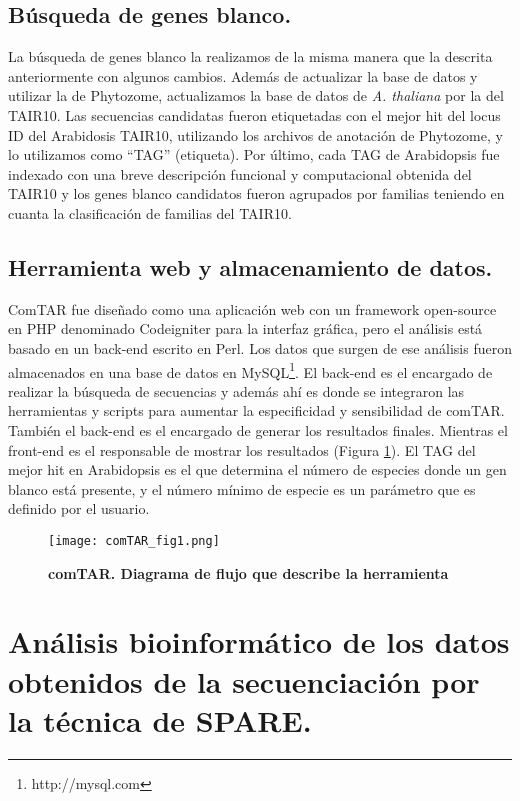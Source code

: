 \subsection{Búsqueda de genes blanco.}
La búsqueda de genes blanco la realizamos de la misma manera que la descrita anteriormente con algunos cambios.
Además de actualizar la base de datos y utilizar la de Phytozome, actualizamos la base de datos de \textit{A. thaliana} por la del TAIR10.
Las secuencias candidatas fueron etiquetadas con el mejor hit del locus ID del Arabidosis TAIR10, utilizando los archivos de anotación de Phytozome, y lo utilizamos como ``TAG'' (etiqueta).
Por último, cada TAG de Arabidopsis fue indexado con una breve descripción funcional y computacional obtenida del TAIR10 y los genes blanco candidatos fueron agrupados por familias teniendo en cuanta la clasificación de familias del TAIR10.

\subsection{Herramienta web y almacenamiento de datos.}
ComTAR fue diseñado como una aplicación web con un framework open-source en PHP denominado Codeigniter para la interfaz gráfica, pero el análisis está basado en un back-end escrito en Perl.
Los datos que surgen de ese análisis fueron almacenados en una base de datos en MySQL\footnote{http://mysql.com}.
El back-end es el encargado de realizar la búsqueda de secuencias y además ahí es donde se integraron las herramientas y scripts para aumentar la especificidad y sensibilidad de comTAR. 
También el back-end es el encargado de generar los resultados finales.
Mientras el front-end es el responsable de mostrar los resultados (Figura \ref{fig:comTAR_fig1}).
El TAG del mejor hit en Arabidopsis es el que determina el número de especies donde un gen blanco está presente, y el número mínimo de especie es un parámetro que es definido por el usuario.

\begin{figure}[htbp!] 
    \centering    
    \texttt{[image: comTAR\_fig1.png]}
    \caption[comTAR. Diagrama de flujo]{
    \textbf{comTAR. Diagrama de flujo que describe la herramienta}
    }
    \label{fig:comTAR_fig1}
\end{figure}


\section{Análisis bioinformático de los datos obtenidos de la secuenciación por la técnica de SPARE.}\label{sec:analisis_spare}

